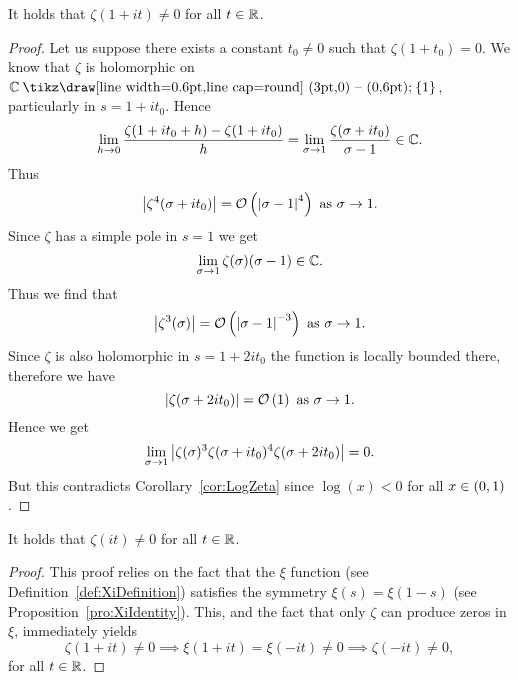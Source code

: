 \begin{theorem}
	It holds that $\zeta(1 + it) \neq 0$ for all $t \in \mathbb{R}$.
\end{theorem}
\begin{proof}
	Let us suppose there exists a constant $t_0 \neq 0$ such that $\zeta(1 + t_0) = 0$. We know that $\zeta$ is holomorphic on $\field{C} \mysetminus \{1\}$, particularly in $s = 1 + it_0$. Hence
\begin{equation*}
	\lim\limits_{h \to 0} \frac{\zeta(1 + it_0 + h) - \zeta(1 + it_0)}{h} = \lim\limits_{\sigma \to 1} \frac{\zeta(\sigma + it_0)}{\sigma - 1} \in \mathbb{C}.
\end{equation*}
	Thus
\begin{equation*}
	\left|\zeta^4(\sigma + it_0)\right| = \mathcal{O}\left(\left|\sigma - 1\right|^4\right) \text{ as } \sigma \to 1.
\end{equation*}
	Since $\zeta$ has a simple pole in $s = 1$ we get
\begin{equation*}
	\lim\limits_{\sigma \to 1}\zeta(\sigma) (\sigma - 1) \in \mathbb{C}.
\end{equation*}
	Thus we find that
\begin{equation*}
	 \left|\zeta^3(\sigma)\right| = \mathcal{O}\left(\left|\sigma - 1\right|^{-3}\right) \text{ as } \sigma \to 1.
\end{equation*}
	Since $\zeta$ is also holomorphic in $s = 1 + 2it_0$ the function is locally bounded there, therefore we have
\begin{equation*}
	 \left|\zeta(\sigma + 2it_0)\right| = \mathcal{O}\left(1\right) \text{ as } \sigma \to 1.
\end{equation*}
	Hence we get
\begin{equation*}
	 \lim\limits_{\sigma \to 1} \left|\zeta(\sigma)^3 \zeta(\sigma + it_0)^4 \zeta(\sigma + 2it_0)\right| = 0.
\end{equation*}
	But this contradicts Corollary~\ref{cor:LogZeta} since $\log(x) < 0$ for all $x \in \left(0 , 1\right)$.
\end{proof}


\begin{corollary}
	It holds that $\zeta(it) \neq 0$ for all $t \in \mathbb{R}$.
\end{corollary}
\begin{proof}
	This proof relies on the fact that the $\xi$ function (see Definition~\ref{def:XiDefinition}) satisfies the symmetry $\xi(s) = \xi(1 - s)$ (see Proposition~\ref{pro:XiIdentity}). This, and the fact that only $\zeta$ can produce zeros in $\xi$, immediately yields
\begin{equation*}
	\zeta(1 + it) \neq 0 \implies \xi(1 + it) = \xi(-it) \neq 0 \implies \zeta(-it) \neq 0,	
\end{equation*}
	for all $t \in \mathbb{R}$.
\end{proof}


